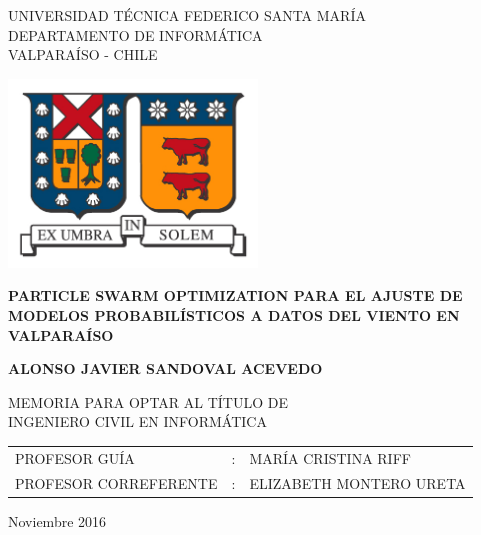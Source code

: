 
\begin{center}
  \begin{spacing}{1}
    {\large UNIVERSIDAD TÉCNICA FEDERICO SANTA MARÍA}\\
    DEPARTAMENTO DE INFORMÁTICA\\
    VALPARAÍSO - CHILE
  \end{spacing}

  \vspace{12mm}
  \includegraphics[height=50mm]{figures/usm_logo.png}
  \vspace{15mm}

  \begin{spacing}{1.5} 
    \textbf{\large PARTICLE SWARM OPTIMIZATION PARA EL AJUSTE DE MODELOS
      PROBABILÍSTICOS A DATOS DEL VIENTO EN VALPARAÍSO}\\
  \end{spacing}

  \vspace{20mm}
  \textbf{\large ALONSO JAVIER SANDOVAL ACEVEDO}
  \vspace{12mm}

  \begin{spacing}{1.25} 
    MEMORIA PARA OPTAR AL TÍTULO DE\\
    INGENIERO CIVIL EN INFORMÁTICA
  \end{spacing}

  \vspace{15mm}
  \begin{table}[h]
    \begin{center}
      \begin{tabular}{ l c l }
        PROFESOR GUÍA & : & MARÍA CRISTINA RIFF\\
        PROFESOR CORREFERENTE & : & ELIZABETH MONTERO URETA\\
      \end{tabular}
    \end{center}
  \end{table}

  \vfill
  \large Noviembre 2016
\end{center}
